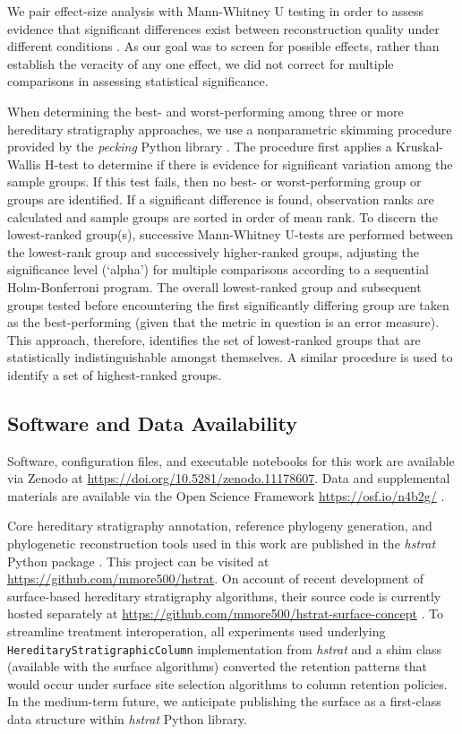 We pair effect-size analysis with Mann-Whitney U testing in order to assess evidence that significant differences exist between reconstruction quality under different conditions \citep{mann1947on}.
As our goal was to screen for possible effects, rather than establish the veracity of any one effect, we did not correct for multiple comparisons in assessing statistical significance.


When determining the best- and worst-performing among three or more hereditary stratigraphy approaches, we use a nonparametric skimming procedure provided by the \textit{pecking} Python library \citep{moreno2024pecking}.
The procedure first applies a Kruskal-Wallis H-test to determine if there is evidence for significant variation among the sample groups.
If this test fails, then no best- or worst-performing group or groups are identified.
If a significant difference is found, observation ranks are calculated and sample groups are sorted in order of mean rank.
To discern the lowest-ranked group(s), successive Mann-Whitney U-tests are performed between the lowest-rank group and successively higher-ranked groups, adjusting the significance level (`alpha') for multiple comparisons according to a sequential Holm-Bonferroni program.
The overall lowest-ranked group and subsequent groups tested before encountering the first significantly differing group are taken as the best-performing (given that the metric in question is an error measure).
This approach, therefore, identifies the set of lowest-ranked groups that are statistically indistinguishable amongst themselves.
A similar procedure is used to identify a set of highest-ranked groups.

\subsection{Software and Data Availability}

Software, configuration files, and executable notebooks for this work are available via Zenodo at \url{https://doi.org/10.5281/zenodo.11178607}.
Data and supplemental materials are available via the Open Science Framework \url{https://osf.io/n4b2g/} \citep{foster2017open}.

Core hereditary stratigraphy annotation, reference phylogeny generation, and phylogenetic reconstruction tools used in this work are published in the \textit{hstrat} Python package \citep{moreno2022hstrat}.
This project can be visited at \url{https://github.com/mmore500/hstrat}.
On account of recent development of surface-based hereditary stratigraphy algorithms, their source code is currently hosted separately at \url{https://github.com/mmore500/hstrat-surface-concept} \citep{moreno2024hsurf}.
To streamline treatment interoperation, all experiments used underlying \texttt{HereditaryStratigraphicColumn} implementation from \textit{hstrat} and a shim class (available with the surface algorithms) converted the retention patterns that would occur under surface site selection algorithms to column retention policies.
In the medium-term future, we anticipate publishing the surface as a first-class data structure within \textit{hstrat} Python library.

